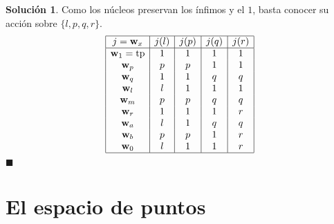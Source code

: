 \documentclass[12pt,letterpaper,titlepage]{article}
\newcommand{\xqed}[1]{%
  \leavevmode\unskip\penalty9999 \hbox{}\nobreak\hfill
  \quad\hbox{\ensuremath{#1}}}
\theoremstyle{definition}
\newtheorem*{soltemp}{Solución}
\newenvironment{sol}[1]{%
    \begin{soltemp}#1}{%
    \xqed{\blacksquare}\end{soltemp}%
}
\newcommand\vnuc[1]{\mathbf v_{#1}}
\newcommand\wnuc[1]{\mathbf w_{#1}}
\newcommand\<{\langle}
\renewcommand\>{\rangle}
\newcommand{\id}{\mathrm{id}}
\newcommand{\tp}{\mathrm{tp}}
\begin{document}
\begin{sol}
    Como los núcleos preservan los ínfimos y el $1$,
    basta conocer su acción sobre $\{l,p,q,r\}$.
    \[ 
        \begin{array}{|c|c|c|c|c|}
            \hline
        j = \wnuc x & j(l) & j(p) & j(q) & j(r) \\
            \hline
      \wnuc 1 = \tp &  1   & 1    & 1    & 1 \\
            \wnuc p &  p   & p    & 1    & 1 \\
            \wnuc q &  1   & 1    & q    & q \\
            \wnuc l &  l   & 1    & 1    & 1 \\
            \wnuc m &  p   & p    & q    & q \\
            \wnuc r &  1   & 1    & 1    & r \\
            \wnuc a &  l   & 1    & q    & q \\
            \wnuc b &  p   & p    & 1    & r \\
            \wnuc 0 &  l   & 1    & 1    & r \\
            \hline
        \end{array}
    \]
\end{sol}

\part{El espacio de puntos}
\end{document}
